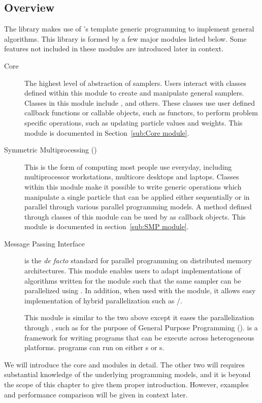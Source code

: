 \subsection{Overview}

The \vsmc library makes use of \cpp's template generic programming to
implement general \smc algorithms. This library is formed by a few major
modules listed below. Some features not included in these modules are
introduced later in context.
\begin{description}
  \item[Core] The highest level of abstraction of \smc samplers. Users
    interact with classes defined within this module to create and manipulate
    general \smc samplers. Classes in this module include ,
     and others. These classes use user defined callback
    functions or callable objects, such as functors, to perform problem
    specific operations, such as updating particle values and weights. This
    module is documented in Section~\ref{sub:Core module}.
  \item[Symmetric Multiprocessing (\smp)] This is the form of computing most
    people use everyday, including multiprocessor workstations, multicore
    desktops and laptops. Classes within this module make it possible to write
    generic operations which manipulate a single particle that can be applied
    either sequentially or in parallel through various parallel programming
    models. A method defined through classes of this module can be used by
     as callback objects. This module is documented in
    section~\ref{sub:SMP module}.
  \item[Message Passing Interface] \mpi is the \emph{de facto} standard
    for parallel programming on distributed memory architectures. This module
    enables users to adapt implementations of algorithms written for the \smp
    module such that the same sampler can be parallelized using \mpi. In
    addition, when used with the \smp module, it allows easy implementation of
    hybrid parallelization such as \mpi/\openmp.
  \item[\opencl] This module is similar to the two above except it eases the
    parallelization through \opencl, such as for the purpose of General
    Purpose \gpu Programming (\gpgpu). \opencl is a framework for writing
    programs that can be execute across heterogeneous platforms. \opencl
    programs can run on either \cpu{}s or \gpu{}s.
\end{description}
We will introduce the core and \smp modules in detail. The other two will
requires substantial knowledge of the underlying programming models, and it is
beyond the scope of this chapter to give them proper introduction. However,
examples and performance comparison will be given in context later.

